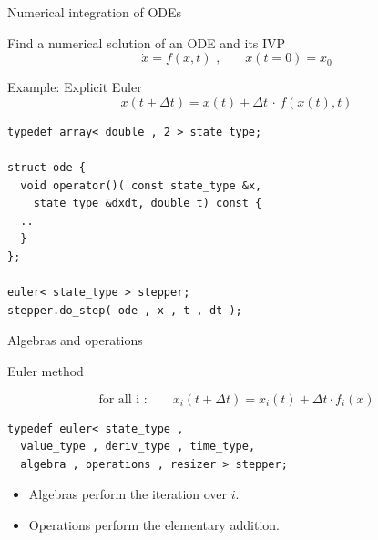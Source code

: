 \documentclass{beamer}
\newcommand{\rem}[1]{}
\newcommand{\heading}[1]{\centerline{\Large #1} \vspace{0.5em}}
\begin{document}
\begin{frame}[fragile]
  
 \heading{Numerical integration of ODEs}
  
\vspace{2ex}
    Find a numerical solution of an ODE and its IVP
    \[ \dot{x} = f(x,t) \,\,\textrm{,} \quad \quad x(t=0) = x_0\]

   \vspace{2ex}

   Example: Explicit Euler
   \[ x(t + \Delta t ) = x(t) + \Delta t \,\cdot\, f(x(t),t) \]

   \vspace{2ex}

   \begin{lstlisting}[basicstyle=\scriptsize\ttfamily]
typedef array< double , 2 > state_type;

struct ode {
  void operator()( const state_type &x,
    state_type &dxdt, double t) const {
  ..
  }
};

euler< state_type > stepper;
stepper.do_step( ode , x , t , dt );
\end{lstlisting}


   \vspace{2ex}
\rem{
   General scheme of order $s$
    \[ x(t) \,\, \mapsto \,\, x(t+\Delta t) \quad \quad \text{, or}\]
    \[x(t + \Delta t) = \mathcal{F}_t x(t) + \mathcal{O}(\Delta t^{s+1})\] }

\end{frame}





\begin{frame}[fragile]

 \heading{Algebras and operations}

 \vspace{2ex}

Euler method

$$\text{for all i :}  \quad \quad x_i(t+\Delta t) = x_i(t) + \Delta t \cdot f_i(x)$$

\vspace{2ex}

\begin{lstlisting}
typedef euler< state_type ,
  value_type , deriv_type , time_type,
  algebra , operations , resizer > stepper; 
\end{lstlisting}


\begin{itemize}
\item Algebras perform the iteration over $i$.
\item Operations perform the elementary addition.
\end{itemize}


\end{frame}
\end{document}
